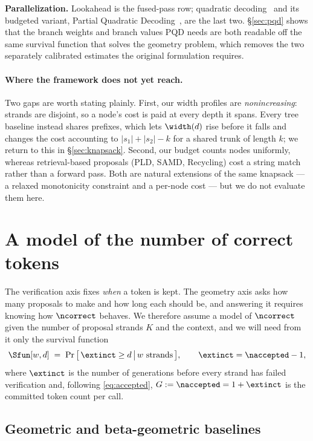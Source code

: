 \documentclass{article} %
\makeatletter
\newenvironment{ai}
  {\color{lightgray}%
   \@ifpackageloaded{caption}{\captionsetup{font={color=lightgray}}}{}%
   \let\ai@savedfloatreset\@floatboxreset
   \g@addto@macro\@floatboxreset{\color{lightgray}}}
  {\global\let\@floatboxreset\ai@savedfloatreset}
\makeatother
\begin{document}
\begin{ai}
\textbf{Parallelization.} Lookahead is the fused-pass row; quadratic
decoding~\citep{samragh2025future} and its budgeted variant, Partial Quadratic
Decoding~\citep{draxler2025ptp}, are the last two. \S\ref{sec:pqd} shows that the branch
weights and branch values PQD needs are both readable off the same survival
function that solves the geometry problem, which removes the two separately
calibrated estimates the original formulation requires.

\paragraph{Where the framework does not yet reach.}
Two gaps are worth stating plainly. First, our width profiles are
\emph{nonincreasing}: strands are disjoint, so a node's cost is paid at every
depth it spans. Every tree baseline instead shares prefixes, which lets
$\width(d)$ rise before it falls and changes the cost accounting to
$|s_1| + |s_2| - k$ for a shared trunk of length $k$; we return to this in
\S\ref{sec:knapsack}. Second, our budget counts nodes uniformly, whereas
retrieval-based proposals (PLD, SAMD, Recycling) cost a string match rather than
a forward pass. Both are natural extensions of the same knapsack --- a relaxed
monotonicity constraint and a per-node cost --- but we do not evaluate them here.

\section{A model of the number of correct tokens}
\label{sec:model}

The verification axis fixes \emph{when} a token is kept. The geometry axis asks
how many proposals to make and how long each should be, and answering it requires
knowing how $\ncorrect$ behaves. We therefore assume a model of $\ncorrect$ given
the number of proposal strands $K$ and the context, and we will need from it only
the survival function
\begin{equation}
  \Sfun[w, d] \;=\; \Pr\big[\, \extinct \geq d \,\big|\, w \text{ strands} \,\big],
  \qquad \extinct = \naccepted - 1,
  \label{eq:survival}
\end{equation}
where $\extinct$ is the number of generations before every strand has failed
verification and, following \eqref{eq:accepted}, $G := \naccepted = 1 + \extinct$
is the committed token count per call.

\subsection{Geometric and beta-geometric baselines}


\end{ai}
\end{document}
